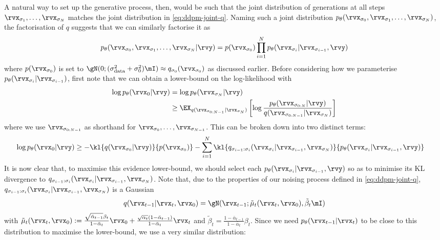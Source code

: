 A natural way to set up the generative process, then, would be such that the joint distribution of generations at all steps $\rvx_{\sigma_1},\ldots,\rvx_{\sigma_N}$ matches the joint distribution in \cref{eq:ddpm-joint-q}. Naming such a joint distribution $p_\theta(\rvx_{\sigma_0},\rvx_{\sigma_1},\ldots,\rvx_{\sigma_N})$, the factorisation of $q$ suggests that we can similarly factorise it as
\begin{equation} \label{eq:ddpm-joint-p}
    p_\theta(\rvx_{\sigma_0},\rvx_{\sigma_1},\ldots,\rvx_{\sigma_N}|\rvy) = p(\rvx_{\sigma_0}) \prod_{i=1}^N p_\theta(\rvx_{\sigma_{i}}|\rvx_{\sigma_{i-1}}, \rvy)
\end{equation}
where $p(\rvx_{\sigma_0})$ is set to $\gN(0; (\sigma_\text{data}^2+\sigma_0^2)\mI) \approx q_{\sigma_0}(\rvx_{\sigma_0})$ as discussed earlier. Before considering how we parameterise $p_\theta(\rvx_{\sigma_{i}}|\rvx_{\sigma_{i-1}})$, first note that we can obtain a lower-bound on the log-likelihood with
\begin{align}
    \log p_\theta(\rvx_0|\rvy) &= \log p_\theta(\rvx_{\sigma_N}|\rvy) \\
    &\geq \EX_{q(\rvx_{\sigma_{0:N-1}}|\rvx_{\sigma_N})} \left[ \log \frac{p_\theta (\rvx_{\sigma_{0:N}}|\rvy)}{q(\rvx_{\sigma_{0:N-1}}|\rvx_{\sigma_N})} \right]
\end{align}
where we use $\rvx_{\sigma_{0:N-1}}$ as shorthand for $\rvx_{\sigma_{0}},\ldots,\rvx_{\sigma_{N-1}}$. This can be broken down into two distinct terms:
\begin{align} \label{eq:diffusion-elbo-2}
    \log p_\theta(\rvx_0|\rvy) &\geq - \kl{q(\rvx_{\sigma_0}|\rvy)}{p(\rvx_{\sigma_0})} - \sum_{i=1}^N \kl{q_{\sigma_{i-1}:\sigma_{i}}(\rvx_{\sigma_i}|\rvx_{\sigma_{i-1}}, \rvx_{\sigma_N})}{p_\theta(\rvx_{\sigma_{i}}|\rvx_{\sigma_{i-1}}, \rvy)}
\end{align}
It is now clear that, to maximise this evidence lower-bound, we should select each $p_\theta(\rvx_{\sigma_{i}}|\rvx_{\sigma_{i-1}}, \rvy)$ so as to minimise its KL divergence to $q_{\sigma_{i-1}:\sigma_{i}}(\rvx_{\sigma_i}|\rvx_{\sigma_{i-1}}, \rvx_{\sigma_N})$. Note that, due to the properties of our noising process defined in \cref{eq:ddpm-joint-q}, $q_{\sigma_{i-1}:\sigma_{i}}(\rvx_{\sigma_i}|\rvx_{\sigma_{i-1}}, \rvx_{\sigma_N})$ is a Gaussian 
\begin{equation}
    q(\rvx_{t-1}|\rvx_t, \rvx_0) = \gN ( \rvx_{t-1} ; \tilde{\mathbf{\mu}}_t(\rvx_t,\rvx_0), \tilde{\beta}_t \mI )
\end{equation}
with $\tilde{\mathbf{\mu}}_t(\rvx_t,\rvx_0) := \frac{\sqrt{\bar{\alpha}_{t-1}}\beta_t}{1-\bar{\alpha}_t}\rvx_0 + \frac{\sqrt{\alpha_t}(1-\bar{\alpha}_{t-1})}{1-\bar{\alpha}_t}\rvx_t$ and $\tilde{\beta}_t = \frac{1-\bar{\alpha}_{t-1}}{1-\bar{\alpha}_t} \beta_t$. Since we need $p_\theta(\rvx_{t-1}|\rvx_t)$ to be close to this distribution to maximise the lower-bound, we use a very similar distribution:

